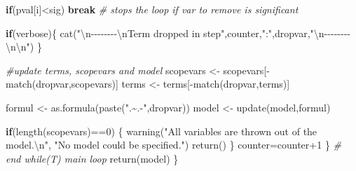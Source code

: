 \documentclass[
]{article}
\newenvironment{Shaded}{\begin{snugshade}}{\end{snugshade}}
\newcommand{\CommentTok}[1]{\textcolor[rgb]{0.56,0.35,0.01}{\textit{#1}}}
\newcommand{\ControlFlowTok}[1]{\textcolor[rgb]{0.13,0.29,0.53}{\textbf{#1}}}
\newcommand{\DecValTok}[1]{\textcolor[rgb]{0.00,0.00,0.81}{#1}}
\newcommand{\FunctionTok}[1]{\textcolor[rgb]{0.00,0.00,0.00}{#1}}
\newcommand{\NormalTok}[1]{#1}
\newcommand{\OtherTok}[1]{\textcolor[rgb]{0.56,0.35,0.01}{#1}}
\newcommand{\SpecialCharTok}[1]{\textcolor[rgb]{0.00,0.00,0.00}{#1}}
\newcommand{\StringTok}[1]{\textcolor[rgb]{0.31,0.60,0.02}{#1}}
\begin{document}
\begin{Shaded}
\begin{Highlighting}[]
    \ControlFlowTok{if}\NormalTok{(pval[i]}\SpecialCharTok{\textless{}}\NormalTok{sig) }\ControlFlowTok{break} \CommentTok{\# stops the loop if var to remove is significant}
    
    \ControlFlowTok{if}\NormalTok{(verbose)\{}
      \FunctionTok{cat}\NormalTok{(}\StringTok{"}\SpecialCharTok{\textbackslash{}n}\StringTok{{-}{-}{-}{-}{-}{-}{-}{-}}\SpecialCharTok{\textbackslash{}n}\StringTok{Term dropped in step"}\NormalTok{,counter,}\StringTok{":"}\NormalTok{,dropvar,}\StringTok{"}\SpecialCharTok{\textbackslash{}n}\StringTok{{-}{-}{-}{-}{-}{-}{-}{-}}\SpecialCharTok{\textbackslash{}n\textbackslash{}n}\StringTok{"}\NormalTok{)              }
\NormalTok{    \}}
    
    \CommentTok{\#update terms, scopevars and model}
\NormalTok{    scopevars }\OtherTok{\textless{}{-}}\NormalTok{ scopevars[}\SpecialCharTok{{-}}\FunctionTok{match}\NormalTok{(dropvar,scopevars)]}
\NormalTok{    terms }\OtherTok{\textless{}{-}}\NormalTok{ terms[}\SpecialCharTok{{-}}\FunctionTok{match}\NormalTok{(dropvar,terms)]}
    
\NormalTok{    formul }\OtherTok{\textless{}{-}} \FunctionTok{as.formula}\NormalTok{(}\FunctionTok{paste}\NormalTok{(}\StringTok{".\textasciitilde{}.{-}"}\NormalTok{,dropvar))}
\NormalTok{    model }\OtherTok{\textless{}{-}} \FunctionTok{update}\NormalTok{(model,formul)}
    
    \ControlFlowTok{if}\NormalTok{(}\FunctionTok{length}\NormalTok{(scopevars)}\SpecialCharTok{==}\DecValTok{0}\NormalTok{) \{}
      \FunctionTok{warning}\NormalTok{(}\StringTok{"All variables are thrown out of the model.}\SpecialCharTok{\textbackslash{}n}\StringTok{"}\NormalTok{,}
              \StringTok{"No model could be specified."}\NormalTok{)}
      \FunctionTok{return}\NormalTok{()}
\NormalTok{    \}}
\NormalTok{    counter}\OtherTok{=}\NormalTok{counter}\SpecialCharTok{+}\DecValTok{1}
\NormalTok{  \} }\CommentTok{\# end while(T) main loop}
  \FunctionTok{return}\NormalTok{(model)}
\NormalTok{\}}
\end{Highlighting}
\end{Shaded}
\end{document}
